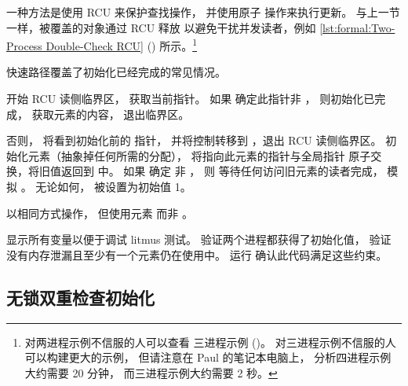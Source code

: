 \begin{listing}
\caption{两进程双重检查 RCU}
\label{lst:formal:Two-Process Double-Check RCU}
\end{listing}

一种方法是使用 RCU 来保护查找操作，
并使用原子  操作来执行更新。
与上一节一样，被覆盖的对象通过 RCU 释放
以避免干扰并发读者，例如
\cref{lst:formal:Two-Process Double-Check RCU}
() 所示。\footnote{
	对两进程示例不信服的人可以查看
	三进程示例
	()。
	对三进程示例不信服的人可以构建更大的示例，
	但请注意在 Paul 的笔记本电脑上，
	 分析四进程示例大约需要 20 分钟，
	而三进程示例大约需要 2 秒。}

快速路径覆盖了初始化已经完成的常见情况。
\begin{fcvref}
 开始 RCU 读侧临界区，
 获取当前指针。
如果  确定此指针非 ，
则初始化已完成，
 获取元素的内容，
 退出临界区。

否则， 将看到初始化前的  指针，
并将控制转移到 ，退出 RCU 读侧临界区。
 初始化元素（抽象掉任何所需的分配），
 将指向此元素的指针与全局指针 
原子交换，将旧值返回到  中。
如果  确定  非 ，
则  等待任何访问旧元素的读者完成，
 模拟 。
无论如何， 被设置为初始值 1。
\end{fcvref}

\begin{fcvref}
 以相同方式操作，
但使用元素  而非 。

 显示所有变量以便于调试 litmus 测试。
 验证两个进程都获得了初始化值，
 验证没有内存泄漏且至少有一个元素仍在使用中。
运行  确认此代码满足这些约束。
\end{fcvref}

\QuickQuizEnd

\subsection{无锁双重检查初始化}
\label{sec:together:Lockless Double-Checked Initialization}

